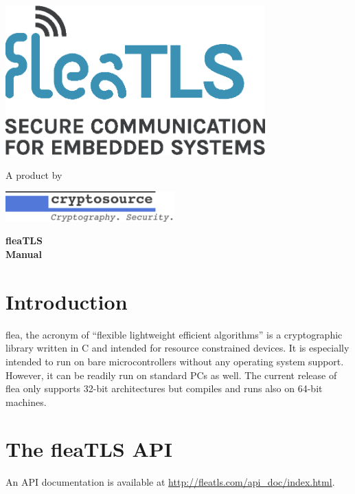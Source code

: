 \documentclass[a4paper,11pt]{scrartcl}
\begin{document}
\begin{center}
  \includegraphics[width=10cm]{fleaTLS_Logo_RGB_NEW.eps}

  \vspace{1.3cm}
  { \LARGE A product by }
  \vspace{1.3cm}

\includegraphics[width=6.5cm]{./cs_logo.pdf}

  \vspace{4cm}

  { \Huge \textbf{fleaTLS \thisFleaVersion} \\ } 
  \vspace{0.4cm}
  { \LARGE \textbf{Manual}}
\end{center}
\thispagestyle{firststyle}

\newpage

\setcounter{tocdepth}{3}
\vspace{1cm}
\tableofcontents

\newpage

\section{Introduction}
flea, the acronym of ``flexible lightweight efficient algorithms'' is a
cryptographic library written in C and intended for resource
constrained devices. 
It is especially intended to run on bare microcontrollers without
any operating system support. However, it can be readily run on standard PCs as
well. The current release of flea only supports 32-bit architectures but
compiles and runs also on 64-bit machines.

 
  \section{The fleaTLS API}
  An API documentation is available at
  \url{http://fleatls.com/api_doc/index.html}.
\end{document}
